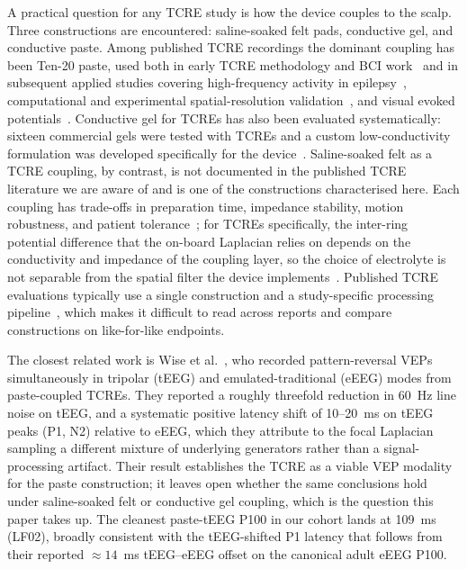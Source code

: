 \documentclass[10pt,a4paper]{article}
\begin{document}
A practical question for any TCRE study is how the device couples to the scalp. Three constructions are encountered: saline-soaked felt pads, conductive gel, and conductive paste. Among published TCRE recordings the dominant coupling has been Ten-20 paste, used both in early TCRE methodology and BCI work~\cite{besio2008bci} and in subsequent applied studies covering high-frequency activity in epilepsy~\cite{toole2019hfo}, computational and experimental spatial-resolution validation~\cite{liu2020spatial}, and visual evoked potentials~\cite{wise2025vep}. Conductive gel for TCREs has also been evaluated systematically: sixteen commercial gels were tested with TCREs and a custom low-conductivity formulation was developed specifically for the device~\cite{vincelli2024}. Saline-soaked felt as a TCRE coupling, by contrast, is not documented in the published TCRE literature we are aware of and is one of the constructions characterised here. Each coupling has trade-offs in preparation time, impedance stability, motion robustness, and patient tolerance~\cite{tallgren2005}; for TCREs specifically, the inter-ring potential difference that the on-board Laplacian relies on depends on the conductivity and impedance of the coupling layer, so the choice of electrolyte is not separable from the spatial filter the device implements~\cite{vincelli2024}. Published TCRE evaluations typically use a single construction and a study-specific processing pipeline~\cite{wise2025vep,stuart2024sleep,toole2019hfo}, which makes it difficult to read across reports and compare constructions on like-for-like endpoints.

The closest related work is Wise et al.~\cite{wise2025vep}, who recorded pattern-reversal VEPs simultaneously in tripolar (tEEG) and emulated-traditional (eEEG) modes from paste-coupled TCREs. They reported a roughly threefold reduction in 60~Hz line noise on tEEG, and a systematic positive latency shift of 10--20~ms on tEEG peaks (P1, N2) relative to eEEG, which they attribute to the focal Laplacian sampling a different mixture of underlying generators rather than a signal-processing artifact. Their result establishes the TCRE as a viable VEP modality for the paste construction; it leaves open whether the same conclusions hold under saline-soaked felt or conductive gel coupling, which is the question this paper takes up. The cleanest paste-tEEG P100 in our cohort lands at 109~ms (LF02), broadly consistent with the tEEG-shifted P1 latency that follows from their reported $\approx 14$~ms tEEG--eEEG offset on the canonical adult eEEG P100.
\end{document}
